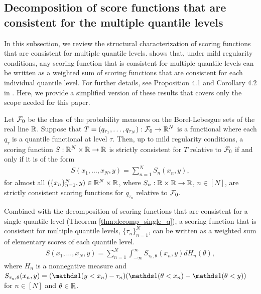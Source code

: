 \subsection{Decomposition of score functions that are consistent for the multiple quantile levels}\label{subsec:decomp_multi_q}
In this subsection, we review the structural characterization of scoring functions that are consistent for multiple quantile levels. \cite{fissler2016multiq} shows that, under mild regularity conditions, any scoring function that is consistent for multiple quantile levels can be written as a weighted sum of scoring functions that are consistent for each individual quantile level. For further details, see Proposition 4.1 and Corollary 4.2 in \cite{fissler2016multiq}. Here, we provide a simplified version of these results that covers only the scope needed for this paper.

\begin{theorem} \label{thm:decomp_multi_q}
Let $\mathcal{F}_0$ be the class of the probability measures on the Borel-Lebesgue sets of the real line $\mathbb{R}$. Suppose that $T = (q_{\tau_1}, \ldots, q_{\tau_N}): \mathcal{F}_0 \to \mathbb{R}^N$ is a functional where each $q_{\tau}$ is a quantile functional at level $\tau$. Then, up to mild regularity conditions, a scoring function $S: \mathbb{R}^N \times \mathbb{R} \to \mathbb{R}$ is strictly consistent for $T$ relative to $\mathcal{F}_0$ if and only if it is of the form
\begin{align}
    S(x_1, \ldots, x_N, y) = \sum_{n=1}^{N} S_n(x_n, y),
\end{align}
for almost all $(\{x_n\}_{n=1}^N, y) \in \mathbb{R}^N \times \mathbb{R}$, where $S_n: \mathbb{R} \times \mathbb{R} \to \mathbb{R}$, $n \in [N]$, are strictly consistent scoring functions for $q_{\tau_n}$ relative to $\mathcal{F}_0$.
\end{theorem}

Combined with the decomposition of scoring functions that are consistent for a single quantile level (Theorem \ref{thm:decomp_single_q}), a scoring function that is consistent for multiple quantile levels, $\{\tau_n\}_{n=1}^N$, can be written as a weighted sum of elementary scores of each quantile level. 
\begin{align}\label{eq:multi_q_decomp_raw}
S(x_1, \ldots, x_N, y) = \sum_{n=1}^{N} \int_{-\infty}^{\infty} S_{\tau_n, \theta}(x_n, y) dH_{n}(\theta),
\end{align}
where $H_n$ is a nonnegative measure and $S_{\tau_n, \theta}(x_n, y) = (\one(y<x_n)-\tau_n)(\one(\theta<x_n)-\one(\theta<y))$ for $n \in [N]$ and $\theta \in \mathbb{R}$. 





